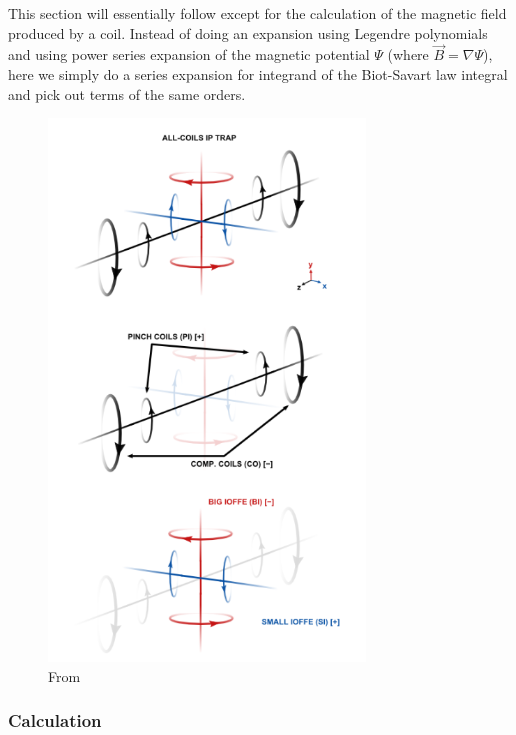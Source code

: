 \documentclass{book}
\theoremstyle{definition}
\begin{document}
This section will essentially follow \cite{allcoil} except for the calculation of the magnetic field produced by a coil. Instead of doing an expansion using Legendre polynomials and using power series expansion of the magnetic potential $\Psi$ (where $\vec{B} = \nabla \Psi$), here we simply do a series expansion for integrand of the Biot-Savart law integral and pick out terms of the same orders.  



\begin{figure}[!htb]
	\centering
	\includegraphics[width=0.75\textwidth]{images/all-coils.png}
	\caption{From \cite{allcoil}}
\end{figure}

\subsubsection*{Calculation}
\end{document}
